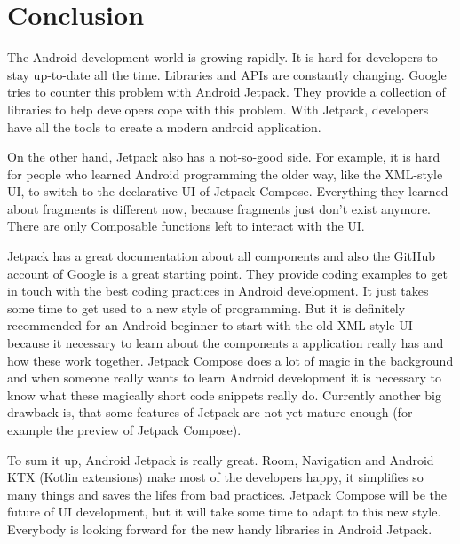 \section{Conclusion}
\label{cha:conclusion}

The Android development world is growing rapidly. It is hard for developers to stay up-to-date all the time. Libraries and APIs are constantly changing. Google tries to counter this problem with Android Jetpack. They provide a collection of libraries to help developers cope with this problem. With Jetpack, developers have all the tools to create a modern android application.

On the other hand, Jetpack also has a not-so-good side. For example, it is hard for people who learned Android programming the older way, like the XML-style UI, to switch to the declarative UI of Jetpack Compose. Everything they learned about fragments is different now, because fragments just don't exist anymore. There are only Composable functions left to interact with the UI.

Jetpack has a great documentation about all components and also the GitHub account of Google is a great starting point. They provide coding examples to get in touch with the best coding practices in Android development. It just takes some time to get used to a new style of programming. But it is definitely recommended for an Android beginner to start with the old XML-style UI because it necessary to learn about the components a application really has and how these work together. Jetpack Compose does a lot of magic in the background and when someone really wants to learn Android development it is necessary to know what these magically short code snippets really do. Currently another big drawback is, that some features of Jetpack are not yet mature enough (for example the preview of Jetpack Compose).

To sum it up, Android Jetpack is really great. Room, Navigation and Android KTX (Kotlin extensions) make most of the developers happy, it simplifies so many things and saves the lifes from bad practices. Jetpack Compose will be the future of UI development, but it will take some time to adapt to this new style. Everybody is looking forward for the new handy libraries in Android Jetpack.